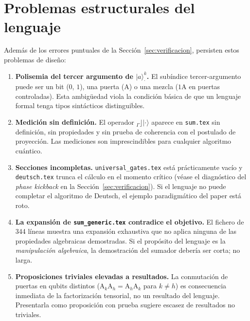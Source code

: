 \documentclass[12pt, a4paper]{article}
\newcommand{\gate}[1]{\text{#1}}
\newcommand{\stateket}[3]{\ket{#1}^{#2}_{#3}}
\newcommand{\ket}[1]{|#1\rangle}
\begin{document}
\section{Problemas estructurales del lenguaje}

Además de los errores puntuales de la Sección~\ref{sec:verificacion},
persisten estos problemas de diseño:

\begin{enumerate}
  \item \textbf{Polisemia del tercer argumento de $\stateket{a}{k}{\cdot}$.}
        El subíndice tercer-argumento puede ser un bit ($0$, $1$), una puerta
        ($\gate{A}$) o una mezcla ($1\gate{A}$ en puertas controladas). Esta
        ambigüedad viola la condición básica de que un lenguaje formal tenga
        tipos sintácticos distinguibles.

  \item \textbf{Medición sin definición.}
        El operador $_{{\Gamma}}\rfloor\ket{\cdot}$ aparece en \texttt{sum.tex}
        sin definición, sin propiedades y sin prueba de coherencia con el
        postulado de proyección. Las mediciones son imprescindibles para
        cualquier algoritmo cuántico.

  \item \textbf{Secciones incompletas.}
        \texttt{universal\_gates.tex} está prácticamente vacío y
        \texttt{deutsch.tex} trunca el cálculo en el momento crítico (véase
        el diagnóstico del \emph{phase kickback} en la
        Sección~\ref{sec:verificacion}). Si el lenguaje no puede completar el
        algoritmo de Deutsch, el ejemplo paradigmático del paper está roto.

  \item \textbf{La expansión de \texttt{sum\_generic.tex} contradice el objetivo.}
        El fichero de 344 líneas muestra una expansión exhaustiva que no aplica
        ninguna de las propiedades algebraicas demostradas. Si el propósito del
        lenguaje es la \emph{manipulación algebraica}, la demostración del
        sumador debería ser corta; no larga.

  \item \textbf{Proposiciones triviales elevadas a resultados.}
        La conmutación de puertas en qubits distintos ($\gate{A}_k \gate{A}_h
          = \gate{A}_h \gate{A}_k$ para $k \neq h$) es consecuencia inmediata
        de la factorización tensorial, no un resultado del lenguaje.
        Presentarla como proposición con prueba sugiere escasez de resultados
        no triviales.


\end{enumerate}
\end{document}
